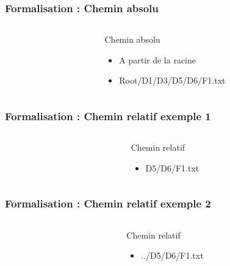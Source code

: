 \documentclass[table,svgnames,hyperref={pdfpagemode=FullScreen}]{beamer}
\begin{document}
\begin{frame}
		\frametitle{Formalisation : Chemin absolu}
		\begin{columns}
			\begin{column}[l]{5cm}
				
			\end{column}
			\begin{column}[r]{5cm}
				\begin{block}{Chemin absolu}
					\begin{itemize}
						\item A partir de la racine 
						\item Root/D1/D3/D5/D6/F1.txt
					\end{itemize}
				\end{block}
			\end{column}
		\end{columns}
\end{frame}

\begin{frame}
		\frametitle{Formalisation : Chemin relatif exemple 1}
		\begin{columns}
			\begin{column}[l]{5cm}
				
			\end{column}
			\begin{column}[r]{5cm}
				\begin{block}{Chemin relatif}
					\begin{itemize}
						\item D5/D6/F1.txt
					\end{itemize}
				\end{block}
			\end{column}
		\end{columns}
\end{frame}

\begin{frame}
		\frametitle{Formalisation : Chemin relatif exemple 2}
		\begin{columns}
			\begin{column}[l]{5cm}
				
			\end{column}
			\begin{column}[r]{5cm}
				\begin{block}{Chemin relatif}
					\begin{itemize}
						\item ../D5/D6/F1.txt
					\end{itemize}
				\end{block}
			\end{column}
		\end{columns}
\end{frame}
\end{document}
